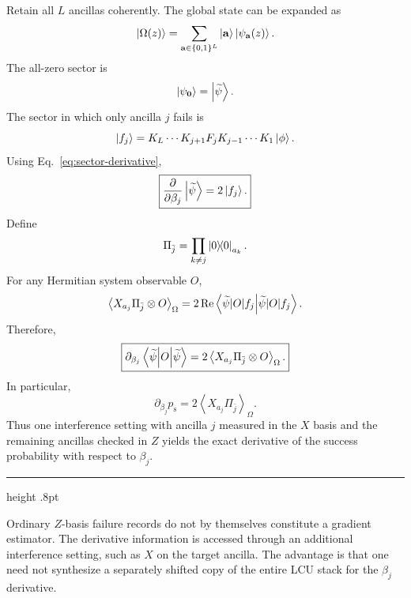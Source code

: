 \documentclass[11pt,a4paper]{article}
\newcommand{\psucc}{p_{\mathrm{s}}}
\newcommand{\kettildepsi}{\ket{\widetilde\psi}}
\newcommand{\expect}[1]{\left\langle #1 \right\rangle}
\newenvironment{warningbox}
 {\par\smallskip\noindent\begin{minipage}{\linewidth}%
  {\color{orange!70!black}\hrule height .8pt}\vspace{5pt}}
 {\vspace{5pt}{\color{orange!70!black}\hrule height .8pt}%
  \end{minipage}\par\smallskip}
\begin{document}
Retain all $L$ ancillas coherently. The global state can be expanded as
\begin{equation}
    \ket{\Omega(z)}
    =\sum_{\mathbf a\in\{0,1\}^L}
    \ket{\mathbf a}\ket{\psi_{\mathbf a}(z)}.
\end{equation}
The all-zero sector is
\begin{equation}
    \ket{\psi_{\mathbf 0}}=\kettildepsi.
\end{equation}
The sector in which only ancilla $j$ fails is
\begin{equation}
\ket{f_j}
=
K_L\cdots K_{j+1}F_jK_{j-1}\cdots K_1\ket{\phi}.
\end{equation}
Using Eq.~\eqref{eq:sector-derivative},
\begin{equation}
\boxed{
\frac{\partial}{\partial\beta_j}\kettildepsi=2\ket{f_j}.
}
\label{eq:derivative-state}
\end{equation}
Define
\begin{equation}
    \Pi_{\bar j}=\prod_{k\neq j}\ketbra{0}{0}_{a_k}.
\end{equation}
For any Hermitian system observable $O$,
\begin{equation}
\expect{X_{a_j}\Pi_{\bar j}\otimes O}_{\Omega}
=2\operatorname{Re}\braket{\widetilde\psi|O|f_j}.
\end{equation}
Therefore,
\begin{equation}
\boxed{
\partial_{\beta_j}
\mel{\widetilde\psi}{O}{\widetilde\psi}
=
2\expect{X_{a_j}\Pi_{\bar j}\otimes O}_{\Omega}.
}
\label{eq:observable-gradient}
\end{equation}
In particular,
\begin{equation}
\boxed{
\partial_{\beta_j}\psucc
=2\expect{X_{a_j}\Pi_{\bar j}}_{\Omega}.
}
\label{eq:success-gradient}
\end{equation}
Thus one interference setting with ancilla $j$ measured in the $X$ basis and the remaining ancillas checked in $Z$ yields the exact derivative of the success probability with respect to $\beta_j$.

\begin{warningbox}
Ordinary $Z$-basis failure records do not by themselves constitute a gradient estimator. The derivative information is accessed through an additional interference setting, such as $X$ on the target ancilla. The advantage is that one need not synthesize a separately shifted copy of the entire LCU stack for the $\beta_j$ derivative.
\end{warningbox}
\end{document}
